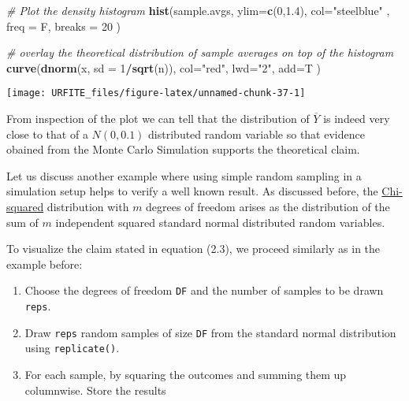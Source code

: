 \documentclass[]{book}
\newenvironment{Shaded}{\begin{snugshade}}{\end{snugshade}}
\newcommand{\KeywordTok}[1]{\textcolor[rgb]{0.13,0.29,0.53}{\textbf{#1}}}
\newcommand{\DataTypeTok}[1]{\textcolor[rgb]{0.13,0.29,0.53}{#1}}
\newcommand{\DecValTok}[1]{\textcolor[rgb]{0.00,0.00,0.81}{#1}}
\newcommand{\FloatTok}[1]{\textcolor[rgb]{0.00,0.00,0.81}{#1}}
\newcommand{\StringTok}[1]{\textcolor[rgb]{0.31,0.60,0.02}{#1}}
\newcommand{\CommentTok}[1]{\textcolor[rgb]{0.56,0.35,0.01}{\textit{#1}}}
\newcommand{\OperatorTok}[1]{\textcolor[rgb]{0.81,0.36,0.00}{\textbf{#1}}}
\newcommand{\NormalTok}[1]{#1}
\providecommand{\tightlist}{%
  \setlength{\itemsep}{0pt}\setlength{\parskip}{0pt}}
\theoremstyle{definition}
\theoremstyle{definition}
\theoremstyle{definition}
\theoremstyle{remark}
\begin{document}
\begin{Shaded}
\begin{Highlighting}[]
\CommentTok{# Plot the density histogram}
\KeywordTok{hist}\NormalTok{(sample.avgs, }
     \DataTypeTok{ylim=}\KeywordTok{c}\NormalTok{(}\DecValTok{0}\NormalTok{,}\FloatTok{1.4}\NormalTok{), }
     \DataTypeTok{col=}\StringTok{"steelblue"}\NormalTok{ , }
     \DataTypeTok{freq =}\NormalTok{ F, }
     \DataTypeTok{breaks =} \DecValTok{20}
\NormalTok{     )}

\CommentTok{# overlay the theoretical distribution of sample averages on top of the histogram}
\KeywordTok{curve}\NormalTok{(}\KeywordTok{dnorm}\NormalTok{(x, }\DataTypeTok{sd =} \DecValTok{1}\OperatorTok{/}\KeywordTok{sqrt}\NormalTok{(n)), }
      \DataTypeTok{col=}\StringTok{"red"}\NormalTok{, }
      \DataTypeTok{lwd=}\StringTok{"2"}\NormalTok{, }
      \DataTypeTok{add=}\NormalTok{T}
\NormalTok{      )}
\end{Highlighting}
\end{Shaded}

\begin{center}\texttt{[image: URFITE\_files/figure-latex/unnamed-chunk-37-1]} \end{center}

From inspection of the plot we can tell that the distribution of
\(\overline{Y}\) is indeed very close to that of a \(N(0, 0.1)\)
distributed random variable so that evidence obained from the Monte
Carlo Simulation supports the theoretical claim.

Let us discuss another example where using simple random sampling in a
simulation setup helps to verify a well known result. As discussed
before, the \protect\hyperlink{chisquare}{Chi-squared} distribution with
\(m\) degrees of freedom arises as the distribution of the sum of \(m\)
independent squared standard normal distributed random variables.

To visualize the claim stated in equation (2.3), we proceed similarly as
in the example before:

\begin{enumerate}
\def\labelenumi{\arabic{enumi}.}
\tightlist
\item
  Choose the degrees of freedom \texttt{DF} and the number of samples to
  be drawn \texttt{reps}.
\item
  Draw \texttt{reps} random samples of size \texttt{DF} from the
  standard normal distribution using \texttt{replicate()}.
\item
  For each sample, by squaring the outcomes and summing them up
  columnwise. Store the results
\end{enumerate}
\end{document}
